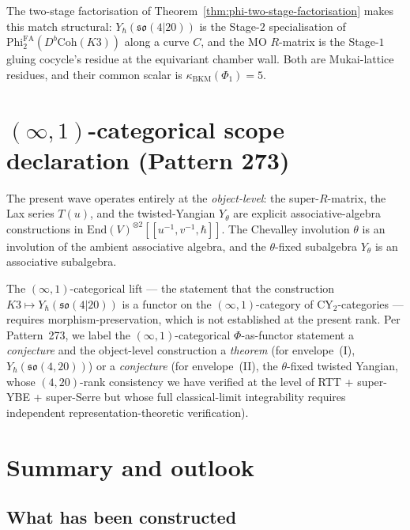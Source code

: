 \documentclass{article}
\providecommand{\fso}{\mathfrak{so}}
\providecommand{\End}{\mathrm{End}}
\providecommand{\kBKM}{\kappa_{\mathrm{BKM}}}
\providecommand{\PhiFA}{\mathrm{Phi}^{\mathrm{FA}}}
\theoremstyle{definition}
\begin{document}
The two-stage factorisation of Theorem~\ref{thm:phi-two-stage-factorisation}
makes this match structural: $Y_\hbar(\fso(4|20))$ is the
Stage-$2$ specialisation of $\PhiFA_2(D^b\mathrm{Coh}(K3))$ along a
curve $C$, and the MO $R$-matrix is the Stage-$1$ gluing cocycle's
residue at the equivariant chamber wall. Both are Mukai-lattice
residues, and their common scalar is $\kBKM(\Phi_1) = 5$.

\section{$(\infty, 1)$-categorical scope declaration (Pattern 273)}
\label{sec:r10-infty-cat-scope}

The present wave operates entirely at the \emph{object-level}: the
super-$R$-matrix, the Lax series $T(u)$, and the twisted-Yangian
$Y_\theta$ are explicit associative-algebra constructions in
$\End(V)^{\otimes 2}[[u^{-1}, v^{-1}, \hbar]]$. The Chevalley
involution $\theta$ is an involution of the ambient associative
algebra, and the $\theta$-fixed subalgebra $Y_\theta$ is an
associative subalgebra.

The $(\infty, 1)$-categorical lift — the statement that the
construction $K3 \mapsto Y_\hbar(\fso(4|20))$ is a functor on the
$(\infty, 1)$-category of CY$_2$-categories — requires
morphism-preservation, which is not established at the present rank.
Per Pattern~273, we label the $(\infty, 1)$-categorical $\Phi$-as-functor
statement a \emph{conjecture} and the object-level construction a
\emph{theorem} (for envelope~(I), $Y_\hbar(\fso(4, 20))$) or a
\emph{conjecture} (for envelope~(II), the $\theta$-fixed twisted Yangian,
whose $(4, 20)$-rank consistency we have verified at the level of
RTT + super-YBE + super-Serre but whose full classical-limit
integrability requires independent representation-theoretic
verification).

\section{Summary and outlook}

\subsection{What has been constructed}
\end{document}
